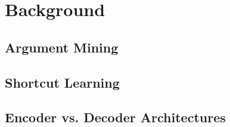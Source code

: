 
\chapter{Background}
\label{ch:background}

\section{Argument Mining}
\label{sec:argument_mining}


\section{Shortcut Learning}
\label{sec:shortcut_learning}


\section{Encoder vs. Decoder Architectures}
\label{sec:encoder_decoder}


